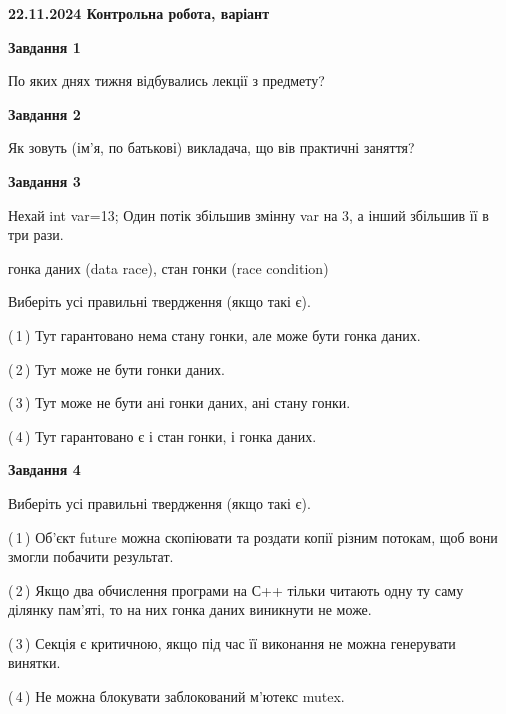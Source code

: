 \documentclass[12pt, ukrainian]{article}
\begin{document}
\begin {large}

\textbf{22.11.2024 Контрольна робота, варіант  }\par


{

\begin{center}
\textbf{Завдання 1}
\end{center}

По яких днях тижня відбувались лекції з предмету?


\begin{center}
\textbf{Завдання 2}
\end{center}

Як зовуть (ім'я, по батькові) викладача, що вів практичні заняття?


\begin{center}
\textbf{Завдання 3}
\end{center}

Нехай int var=13; Один потік збільшив змінну var на 3, а інший збільшив її в три рази.

гонка даних (data race), стан гонки (race condition)

Виберіть усі правильні твердження (якщо такі є).\par
\vspace{2mm}
(\,1\,) Тут гарантовано нема стану гонки, але може бути гонка даних.%

(\,2\,) Тут може не бути гонки даних.%

(\,3\,) Тут може не бути ані гонки даних, ані стану гонки.%

(\,4\,) Тут гарантовано є і стан гонки, і гонка даних.%


\begin{center}
\textbf{Завдання 4}
\end{center}

Виберіть усі правильні твердження (якщо такі є).\par
\vspace{2mm}

(\,1\,) Об’єкт future можна скопіювати та роздати копії різним потокам, щоб вони змогли побачити результат.%

(\,2\,) Якщо два обчислення програми на С++ тільки читають одну ту саму ділянку пам'яті, то на них гонка даних  виникнути не може.%

(\,3\,) Секція є критичною, якщо під час її виконання не можна генерувати винятки.%

(\,4\,) Не можна блокувати заблокований м’ютекс mutex.%


}
\end{large}
\end{document}
